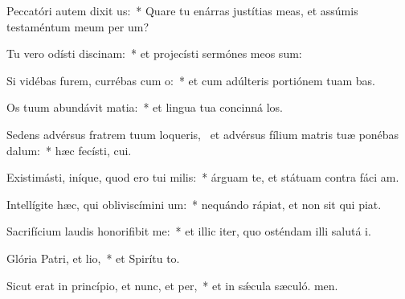 \item Peccatóri autem dixit us:~* Quare tu enárras justítias meas, et assúmis testaméntum meum per  um?
\item Tu vero odísti discinam:~* et projecísti sermónes meos sum:
\item Si vidébas furem, currébas cum o:~* et cum adúlteris portiónem tuam bas.
\item Os tuum abundávit matia:~* et lingua tua concinná los.
\item Sedens advérsus fratrem tuum loqueris,~\pscross{} et advérsus fílium matris tuæ ponébas dalum:~* hæc fecísti,  cui.
\item Existimásti, iníque, quod ero tui milis:~* árguam te, et státuam contra fáci am.
\item Intellígite hæc, qui obliviscímini um:~* nequándo rápiat, et non sit qui piat.
\item Sacrifícium laudis honorifibit me:~* et illic iter, quo osténdam illi salutá i.
\item Glória Patri, et lio,~* et Spirítu to.
\item Sicut erat in princípio, et nunc, et per,~* et in sǽcula sæculó. men.
